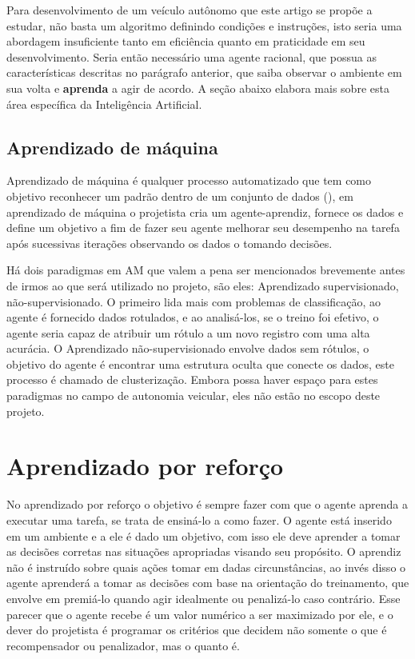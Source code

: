 Para desenvolvimento de um veículo autônomo que este artigo se propõe a estudar, não basta um algoritmo definindo condições e instruções, isto seria uma abordagem insuficiente tanto em eficiência quanto em praticidade em seu desenvolvimento. Seria então necessário uma agente racional, que possua as características descritas no parágrafo anterior, que saiba observar o ambiente em sua volta e \textbf{aprenda} a agir de acordo. A seção abaixo elabora mais sobre esta área específica da Inteligência Artificial.

\subsection{Aprendizado de máquina}
Aprendizado de máquina é qualquer processo automatizado que tem como objetivo reconhecer um padrão dentro de um conjunto de dados (), em aprendizado de máquina o projetista cria um agente-aprendiz, fornece os dados e define um objetivo a fim de fazer seu agente melhorar seu desempenho na tarefa após sucessivas iterações observando os dados o tomando decisões. 

Há dois paradigmas em AM que valem a pena ser mencionados brevemente antes de irmos ao que será utilizado no projeto, são eles: Aprendizado supervisionado, não-supervisionado. O primeiro lida mais com problemas de classificação, ao agente é fornecido dados rotulados, e ao analisá-los, se o treino foi efetivo, o agente seria capaz de atribuir um rótulo a um novo registro com uma alta acurácia. O Aprendizado não-supervisionado envolve dados sem rótulos, o objetivo do agente é encontrar uma estrutura oculta que conecte os dados, este processo é chamado de clusterização. Embora possa haver espaço para estes paradigmas no campo de autonomia veicular, eles não estão no escopo deste projeto.

\section{Aprendizado por reforço}
No aprendizado por reforço o objetivo é sempre fazer com que o agente aprenda a executar uma tarefa, se trata de ensiná-lo a como fazer. O agente está inserido em um ambiente e a ele é dado um objetivo, com isso ele deve aprender a tomar as decisões corretas nas situações apropriadas visando seu propósito. O aprendiz não é instruído sobre quais ações tomar em dadas circunstâncias, ao invés disso o agente aprenderá a tomar as decisões com base na orientação do treinamento, que envolve em premiá-lo quando agir idealmente ou penalizá-lo caso contrário. Esse parecer que o agente recebe é um valor numérico a ser maximizado por ele, e o dever do projetista é programar os critérios que decidem não somente o que é recompensador ou penalizador, mas o quanto é.

